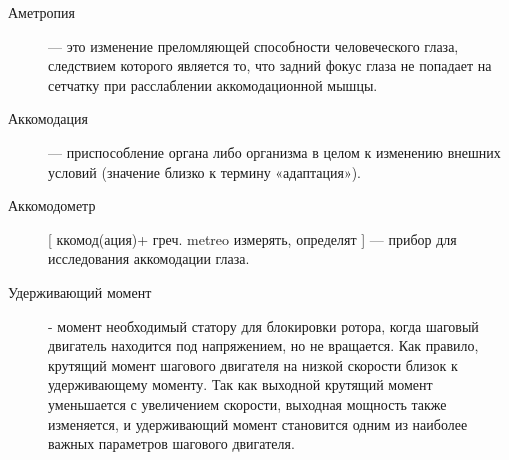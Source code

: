 \begin{description}
\item[Аметропия] --- это изменение преломляющей способности человеческого глаза, следствием которого является то, что задний фокус глаза не попадает на сетчатку при расслаблении аккомодационной мышцы.\cite{b_1}

\item[Аккомодация] --- приспособление органа либо организма в целом к изменению внешних условий (значение близко к термину «адаптация»).\cite{b_2}

\item[Аккомодометр][ ккомод(ация)+ греч. metreo измерять, определят ] --- прибор для исследования аккомодации глаза.\cite{b_3}
\item[Удерживающий момент] - момент необходимый статору для блокировки ротора, когда шаговый двигатель находится под напряжением, но не вращается. Как правило, крутящий момент шагового двигателя на низкой скорости близок к удерживающему моменту. Так как выходной крутящий момент уменьшается с увеличением скорости, выходная мощность также изменяется, и удерживающий момент становится одним из наиболее важных параметров шагового двигателя.\cite{s_3}
\end{description}